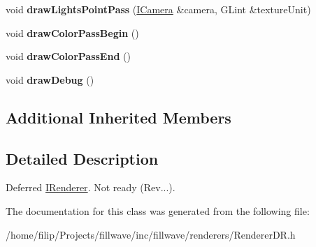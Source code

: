 \begin{DoxyCompactItemize}
\item 
void {\bfseries draw\+Lights\+Point\+Pass} (\hyperlink{classflw_1_1flf_1_1ICamera}{I\+Camera} \&camera, G\+Lint \&texture\+Unit)\hypertarget{classflw_1_1flf_1_1RendererDR_aa37b31115289e5ff3305275e3b6933f9}{}\label{classflw_1_1flf_1_1RendererDR_aa37b31115289e5ff3305275e3b6933f9}

\item 
void {\bfseries draw\+Color\+Pass\+Begin} ()\hypertarget{classflw_1_1flf_1_1RendererDR_a67ecbaeaca15ea841f8e96759fbac89c}{}\label{classflw_1_1flf_1_1RendererDR_a67ecbaeaca15ea841f8e96759fbac89c}

\item 
void {\bfseries draw\+Color\+Pass\+End} ()\hypertarget{classflw_1_1flf_1_1RendererDR_abc5204d63e2309ed1c38c3f6993fc2e4}{}\label{classflw_1_1flf_1_1RendererDR_abc5204d63e2309ed1c38c3f6993fc2e4}

\item 
void {\bfseries draw\+Debug} ()\hypertarget{classflw_1_1flf_1_1RendererDR_a46901e54f1df38e21564b19eebd2d894}{}\label{classflw_1_1flf_1_1RendererDR_a46901e54f1df38e21564b19eebd2d894}

\end{DoxyCompactItemize}
\subsection*{Additional Inherited Members}


\subsection{Detailed Description}
Deferred \hyperlink{classflw_1_1flf_1_1IRenderer}{I\+Renderer}. Not ready (Rev...). 

The documentation for this class was generated from the following file\+:\begin{DoxyCompactItemize}
\item 
/home/filip/\+Projects/fillwave/inc/fillwave/renderers/Renderer\+D\+R.\+h\end{DoxyCompactItemize}
